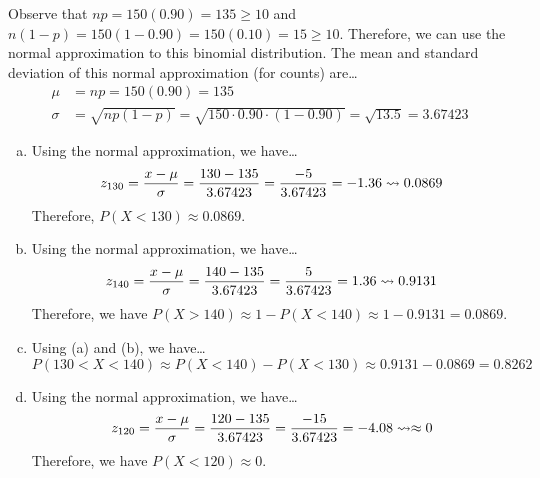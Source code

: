 \documentclass[11pt,letterpaper]{article}
\begin{document}
\sol Observe that $np= 150(0.90)= 135 \geq 10$ and $n(1 - p)= 150(1 - 0.90)= 150(0.10)= 15 \geq 10$. Therefore, we can use the normal approximation to this binomial distribution. The mean and standard deviation of this normal approximation (for counts) are\dots
	\[
	\begin{aligned}
	\mu&= np= 150(0.90)= 135 \\[0.3cm]
	\sigma&= \sqrt{np(1 - p)}= \sqrt{150 \cdot 0.90 \cdot (1 - 0.90)}= \sqrt{13.5}= 3.67423
	\end{aligned}
	\] \pspace

\begin{enumerate}[(a)]
\item Using the normal approximation, we have\dots
	\[
	z_{130}= \dfrac{x - \mu}{\sigma}= \dfrac{130 - 135}{3.67423}= \dfrac{-5}{3.67423}= -1.36 \rightsquigarrow 0.0869
	\]
Therefore, $P(X < 130) \approx 0.0869$. \pspace

\item Using the normal approximation, we have\dots
	\[
	z_{140}= \dfrac{x - \mu}{\sigma}= \dfrac{140 - 135}{3.67423}= \dfrac{5}{3.67423}= 1.36 \rightsquigarrow 0.9131
	\]
Therefore, we have $P(X > 140) \approx 1 - P(X < 140) \approx 1 - 0.9131= 0.0869$. \pspace

\item Using (a) and (b), we have\dots
	\[
	P(130 < X < 140) \approx P(X < 140) - P(X < 130) \approx 0.9131 - 0.0869= 0.8262
	\] \pspace

\item Using the normal approximation, we have\dots
	\[
	z_{120}= \dfrac{x - \mu}{\sigma}= \dfrac{120 - 135}{3.67423}= \dfrac{-15}{3.67423}= -4.08 \rightsquigarrow \approx 0
	\]
Therefore, we have $P(X < 120) \approx 0$. 
\end{enumerate}
\end{document}

